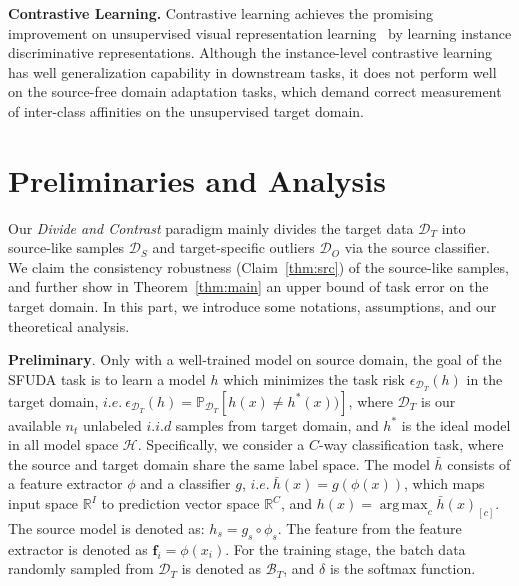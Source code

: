 \documentclass{article}
\def\vf{{\bm{f}}}
\DeclareMathOperator*{\argmax}{arg\,max}
\begin{document}
\textbf{Contrastive Learning.}
Contrastive learning achieves the promising improvement on unsupervised visual representation learning~\cite{CPC_2018,he2019moco,chen2020simclr,CMC_eccv_2020,2019_cvpr_zhuang} by learning instance discriminative representations. Although the instance-level contrastive learning has well generalization capability in downstream tasks, it does not perform well on the source-free domain adaptation tasks, which demand correct measurement of inter-class affinities on the unsupervised target domain.
\section{Preliminaries and Analysis}
\label{sec:prelim}

Our \textit{Divide and Contrast} paradigm mainly divides the target data $\mathcal{D}_T$ into source-like samples $\mathcal{D}_S$ and target-specific outliers $\mathcal{D}_O$ via the source classifier. We claim the consistency robustness (Claim~\ref{thm:src}) of the source-like samples, and further show in Theorem~\ref{thm:main} an upper bound of task error on the target domain. In this part, we introduce some notations, assumptions, and our theoretical analysis. 

\textbf{Preliminary}. 
Only with a well-trained model on source domain, the goal of the SFUDA task is to learn a model $h$ which minimizes the task risk $\epsilon_{\mathcal{D}_T}(h)$ in the target domain, $i.e. \ \epsilon_{\mathcal{D}_T}(h)=\mathbb{P}_{\mathcal{D}_T}[h(x)\neq h^*(x))]$, where $\mathcal{D}_T$ is our available $n_t$ unlabeled $i.i.d$ samples from target domain, and $h^*$ is the ideal model in all model space $\mathcal{H}$. 
Specifically, we consider a $C$-way classification task, where the source and target domain share the same label space. The model $\bar{h}$ consists of a feature extractor $\phi$ and a classifier $g$, $i.e. \ \bar{h}(x) = g(\phi(x))$, which maps input space $\mathbb{R}^I$ to prediction vector space $\mathbb{R}^C$, and $h(x) = \argmax_c \bar{h}(x)_{[c]}$. The source model is denoted as: $h_s = g_s \circ \phi_s$. The feature from the feature extractor is denoted as $\vf_i = \phi(x_i)$. For the training stage, the batch data randomly sampled from $\mathcal{D}_T$ is denoted as $\mathcal{B}_T$, and $\delta$ is the softmax function. 
\end{document}
